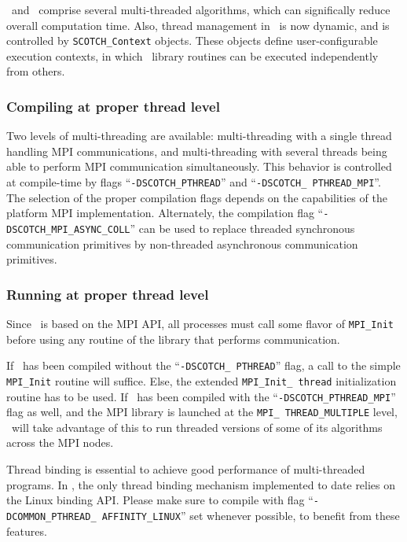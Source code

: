 \scotch\ and \ptscotch\ comprise several multi-threaded algorithms,
which can significally reduce overall computation time. Also, thread
management in \scotch\ is now dynamic, and is controlled by
\texttt{SCOTCH\_\lbt Context} objects. These objects define
user-configurable execution contexts, in which \libptscotch\ library
routines can be executed independently from others.

\subsubsection{Compiling at proper thread level}

Two levels of multi-threading are available: multi-threading with a
single thread handling MPI communications, and multi-threading with
several threads being able to perform MPI communication
simultaneously. This behavior is controlled at compile-time by flags
``\texttt{-DSCOTCH\_\lbt PTHREAD}'' and ``\texttt{-DSCOTCH\_\lbt
PTHREAD\_\lbt MPI}''. The selection of the proper compilation flags
depends on the capabilities of the platform MPI
implementation. Alternately, the compilation flag
``\texttt{-DSCOTCH\_\lbt MPI\_\lbt ASYNC\_\lbt COLL}'' can be
used to replace threaded synchronous communication primitives by
non-threaded asynchronous communication primitives.

\subsubsection{Running at proper thread level}

Since \ptscotch\ is based on the MPI API, all processes must call some
flavor of \texttt{MPI\_\lbt Init} before using any routine of the
library that performs communication.

If \ptscotch\ has been compiled without the ``\texttt{-DSCOTCH\_\lbt
PTHREAD}'' flag, a call to the simple \texttt{MPI\_\lbt Init} routine
will suffice. Else, the extended \texttt{MPI\_\lbt Init\_\lbt
thread} initialization routine has to be used. If \ptscotch\ has been
compiled with the ``\texttt{-DSCOTCH\_\lbt PTHREAD\_\lbt MPI}'' flag
as well, and the MPI library is launched at the \texttt{MPI\_\lbt
THREAD\_\lbt MULTIPLE} level, \ptscotch\ will take advantage of this
to run threaded versions of some of its algorithms across the MPI
nodes.

Thread binding is essential to achieve good performance of
multi-threaded programs. In \scotch, the only thread binding mechanism
implemented to date relies on the Linux binding API. Please make sure
to compile with flag ``\texttt{-DCOMMON\_\lbt PTHREAD\_\lbt
AFFINITY\_\lbt LINUX}'' set whenever possible, to benefit from these
features.

